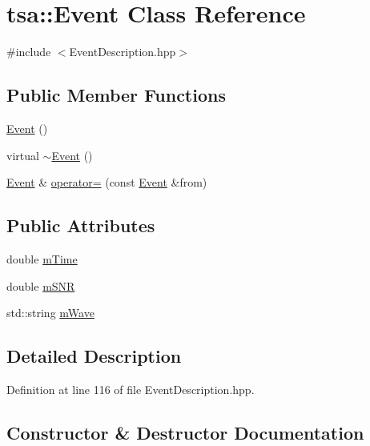 \hypertarget{classtsa_1_1_event}{}\section{tsa\+:\+:Event Class Reference}
\label{classtsa_1_1_event}


{\ttfamily \#include $<$Event\+Description.\+hpp$>$}

\subsection*{Public Member Functions}
\begin{DoxyCompactItemize}
\item 
\hyperlink{classtsa_1_1_event_a2d217d1b64da89180b87e58341b8b76f}{Event} ()
\item 
virtual \hyperlink{classtsa_1_1_event_ae01cd6ea28101fcbf3947de6b4176c3f}{$\sim$\+Event} ()
\item 
\hyperlink{classtsa_1_1_event}{Event} \& \hyperlink{classtsa_1_1_event_a8057303c7d7b0faea2594f86c03e0c97}{operator=} (const \hyperlink{classtsa_1_1_event}{Event} \&from)
\end{DoxyCompactItemize}
\subsection*{Public Attributes}
\begin{DoxyCompactItemize}
\item 
double \hyperlink{classtsa_1_1_event_ac0e06c387142f5f986e1fa40f0b196a0}{m\+Time}
\item 
double \hyperlink{classtsa_1_1_event_a740dc0ff8eb9379a52541fe00ab7c293}{m\+S\+NR}
\item 
std\+::string \hyperlink{classtsa_1_1_event_abbb6ba2540bacfea050d8074d6dd1482}{m\+Wave}
\end{DoxyCompactItemize}


\subsection{Detailed Description}


Definition at line 116 of file Event\+Description.\+hpp.



\subsection{Constructor \& Destructor Documentation}
\mbox{\label{classtsa_1_1_event_a2d217d1b64da89180b87e58341b8b76f}} 
